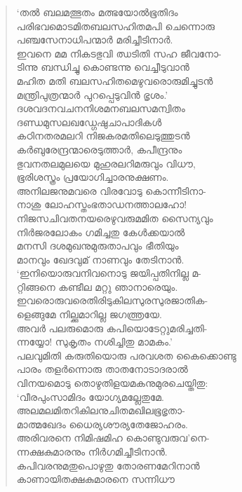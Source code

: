 \begin{verse}
‘തല്‍ ബലമത്ഭുതം മത്ഭയോല്‍ഭൂതിദം\\
പരിഭവമൊടമിതബലസഹിതമപി ചെന്നൊരു\\
പഞ്ചസേനാധിപന്മാര്‍ മരിച്ചീടിനാര്‍.\\
ഇവനെ മമ നികടഭുവി ഝടിതി സഹ ജീവനോ-\\
ടിന്നു ബന്ധിച്ചു കൊണ്ടന്നു വെച്ചീടുവാന്‍\\
മഹിത മതി ബലസഹിതമെഴുവരൊരുമിച്ചുടന്‍\\
മന്ത്രിപുത്രന്മാര്‍ പുറപ്പെടുവിന്‍ ഭൃശം.’\\
ദശവദനവചനനിശമനബലസമന്വിതം\\
ദണ്ഡമുസലഖഡ്ഗേഷുചാപാദികള്‍\\
കഠിനതരമലറി നിജകരമതിലെടുത്തുടന്‍\\
കര്‍ബുരേന്ദ്രന്മാരെടുത്താര്‍, കപീന്ദ്രനും\\
ഭുവനതലമുലയെ മുഹുരലറിമരുവും വിധൗ,\\
ഭൂരിശസ്ത്രം പ്രയോഗിച്ചാരനുക്ഷണം.\\
അനിലജനുമവരെ വിരവോടു കൊന്നീടിനാ-\\
നാശു ലോഹസ്തംഭതാഡനത്താലഹോ!\\
നിജസചിവതനയരെഴുവരുമമിത സൈന്യവും\\
നിര്‍ജരലോകം ഗമിച്ചതു കേള്‍ക്കയാല്‍\\
മനസി ദശമുഖനുമുരുതാപവും ഭീതിയും\\
മാനവും ഖേദവുമ് നാണവും തേടിനാന്‍.\\
‘ഇനിയൊരുവനിവനൊടു ജയിപ്പതിനില്ല മ-\\
റ്റിങ്ങനെ കണ്ടീല മറ്റു ഞാനാരെയും.\\
ഇവരൊരുവരെതിരിടുകിലസുരസുരജാതിക-\\
ളെങ്ങുമേ നില്ക്കുമാറില്ല ജഗത്ത്രയേ.\\
അവര്‍ പലരുമൊരു കപിയൊടേറ്റുമരിച്ചതി-\\
ന്നയ്യോ! സുകൃതം നശിച്ചിതു മാമകം.’\\
പലവുമിതി കരുതിയൊരു പരവശത കൈക്കൊണ്ടു\\
പാരം തളര്‍ന്നൊരു താതനോടാദരാല്‍\\
വിനയമൊടു തൊഴുതിളയമകനുമുരചെയ്തിതു:\\
‘വീരപുംസാമിദം യോഗ്യമല്ലേതുമേ.\\
അലമലമിതറികിലനുചിതമഖിലഭൂഭൃതാ-\\
മാത്മഖേദം ധൈര്യശൗര്യതേജോഹരം.\\
അരിവരനെ നിമിഷമിഹ കൊണ്ടുവരുവ’നെ-\\
ന്നക്ഷകുമാരനും നിര്‍ഗമിച്ചീടിനാന്‍.\\
കപിവരനുമതുപൊഴുതു തോരണമേറിനാന്‍\\
കാണായിതക്ഷകുമാരനെ സന്നിധൗ\\

\end{verse}
